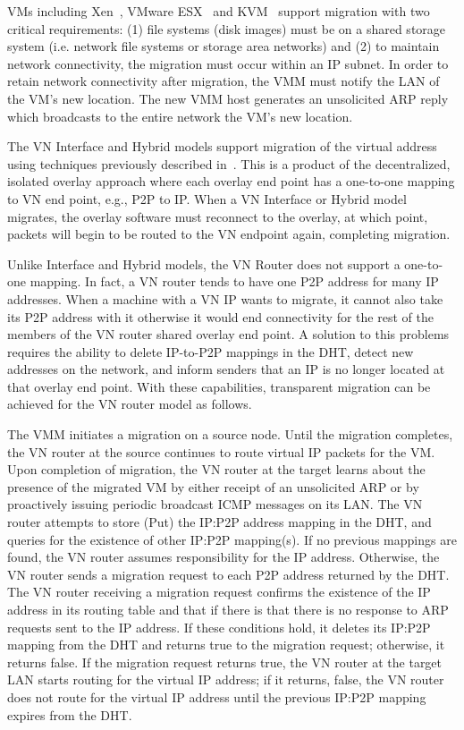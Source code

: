 VMs including Xen~\cite{xen-live}, VMware ESX~\cite{vmotion} and KVM~\cite{kvm}
support migration with two critical requirements: (1) file systems (disk images)
must be on a shared storage system (i.e. network file systems or storage area
networks) and (2) to maintain network connectivity, the migration must occur
within an IP subnet.  In order to retain network connectivity after migration,
the VMM must notify the LAN of the VM's new location.  The new VMM host
generates an unsolicited ARP reply which broadcasts to the entire network the
VM's new location.  

The VN Interface and Hybrid models support migration of the virtual address
using techniques previously described in~\cite{ipop}.  This is a product of the
decentralized, isolated overlay approach where each overlay end point has a
one-to-one mapping to VN end point, e.g., P2P to IP.  When a VN Interface or
Hybrid model migrates, the overlay software must reconnect to the overlay, at
which point, packets will begin to be routed to the VN endpoint again,
completing migration.

Unlike Interface and Hybrid models, the VN Router does not support a one-to-one
mapping.  In fact, a VN router tends to have one P2P address for many IP
addresses.  When a machine with a VN IP wants to migrate, it cannot also take
its P2P address with it otherwise it would end connectivity for the rest of the
members of the VN router shared  overlay end point.  A solution to this
problems requires the ability to delete IP-to-P2P mappings in the DHT, detect
new addresses on the network, and inform senders that an IP is
no longer located at that overlay end point.  With these capabilities,
transparent migration can be achieved for the VN router model as follows. 

The VMM initiates a migration on a source node. Until the migration completes,
the VN router at the source continues to route virtual IP packets for the
VM. Upon completion of migration, the VN router at the target learns about
the presence of the migrated VM by either receipt of an unsolicited ARP
or by proactively issuing periodic broadcast ICMP messages on its LAN.
The VN router attempts to store (Put) the IP:P2P address mapping in the DHT,
and queries for the existence of other IP:P2P mapping(s). If no previous
mappings are found, the VN router assumes responsibility for the IP
address. Otherwise, the VN router sends a migration request to each P2P
address returned by the DHT. The VN router receiving a migration request
confirms the existence of the IP address in its routing table and that if
there is that there is no response to ARP requests sent to the IP address.
If these conditions hold, it deletes its IP:P2P mapping from the DHT and returns
true to the migration request; otherwise, it returns false. If the migration
request returns true, the VN router at the target LAN starts routing for the
virtual IP address; if it returns, false, the VN router does not route
for the virtual IP address until the previous IP:P2P mapping expires
from the DHT.

